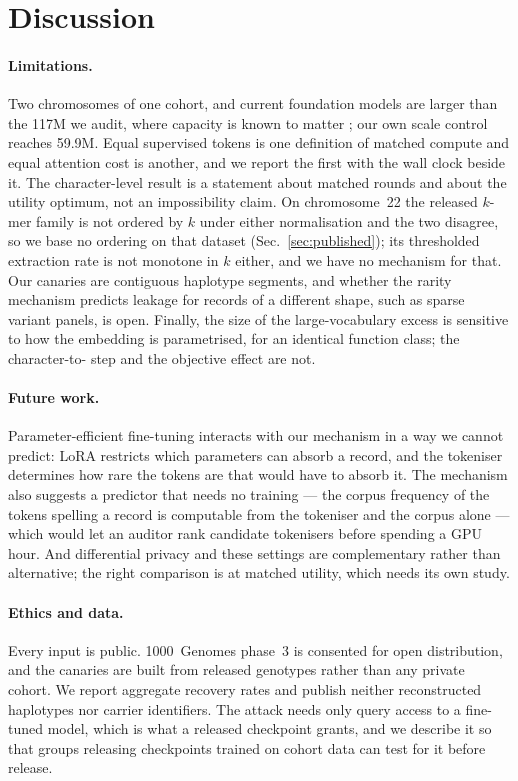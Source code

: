 \section{Discussion}
\label{sec:discussion}

\paragraph{Limitations.}
Two chromosomes of one cohort, and current foundation models are larger than the 117M we audit,
where capacity is known to matter \cite{morris2025capacity}; our own scale control reaches 59.9M.
Equal supervised tokens is one definition of matched compute and equal attention cost is another,
and we report the first with the wall clock beside it. The character-level result is a statement about matched rounds and about the utility optimum, not an
impossibility claim. On chromosome~22 the released $k$-mer family is not ordered by $k$ under either
normalisation and the two disagree, so we base no ordering on that dataset
(Sec.~\ref{sec:published}); its thresholded extraction rate is not monotone in $k$ either, and we
have no mechanism for that. Our canaries are contiguous haplotype segments, and whether the rarity
mechanism predicts leakage for records of a different shape, such as sparse variant panels, is open.
Finally, the size of the large-vocabulary excess is sensitive to how the embedding is parametrised,
for an identical function class; the character-to- step and the objective effect are not.

\paragraph{Future work.}
Parameter-efficient fine-tuning interacts with our mechanism in a way we cannot predict: LoRA
restricts which parameters can absorb a record, and the tokeniser determines how rare the tokens are
that would have to absorb it. The mechanism also suggests a predictor that needs no training --- the
corpus frequency of the tokens spelling a record is computable from the tokeniser and the corpus
alone --- which would let an auditor rank candidate tokenisers before spending a GPU hour. And
differential privacy and these settings are complementary rather than alternative; the right
comparison is at matched utility, which needs its own study.

\paragraph{Ethics and data.}
Every input is public. 1000~Genomes phase~3 is consented for open distribution, and the canaries are
built from released genotypes rather than any private cohort. We report aggregate recovery rates and
publish neither reconstructed haplotypes nor carrier identifiers. The attack needs only query access
to a fine-tuned model, which is what a released checkpoint grants, and we describe it so that groups
releasing checkpoints trained on cohort data can test for it before release.


